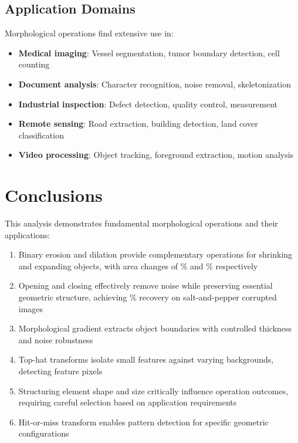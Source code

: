 \documentclass[a4paper, 11pt]{article}
\begin{document}
\subsection{Application Domains}

Morphological operations find extensive use in:

\begin{itemize}
\item \textbf{Medical imaging}: Vessel segmentation, tumor boundary detection, cell counting
\item \textbf{Document analysis}: Character recognition, noise removal, skeletonization
\item \textbf{Industrial inspection}: Defect detection, quality control, measurement
\item \textbf{Remote sensing}: Road extraction, building detection, land cover classification
\item \textbf{Video processing}: Object tracking, foreground extraction, motion analysis
\end{itemize}

\section{Conclusions}

This analysis demonstrates fundamental morphological operations and their applications:
\begin{enumerate}
\item Binary erosion and dilation provide complementary operations for shrinking and expanding
objects, with area changes of \% and
\% respectively
\item Opening and closing effectively remove noise while preserving essential geometric structure,
achieving \% recovery on salt-and-pepper corrupted images
\item Morphological gradient extracts object boundaries with controlled thickness and noise robustness
\item Top-hat transforms isolate small features against varying backgrounds, detecting
 feature pixels
\item Structuring element shape and size critically influence operation outcomes, requiring
careful selection based on application requirements
\item Hit-or-miss transform enables pattern detection for specific geometric configurations
\end{enumerate}
\end{document}
